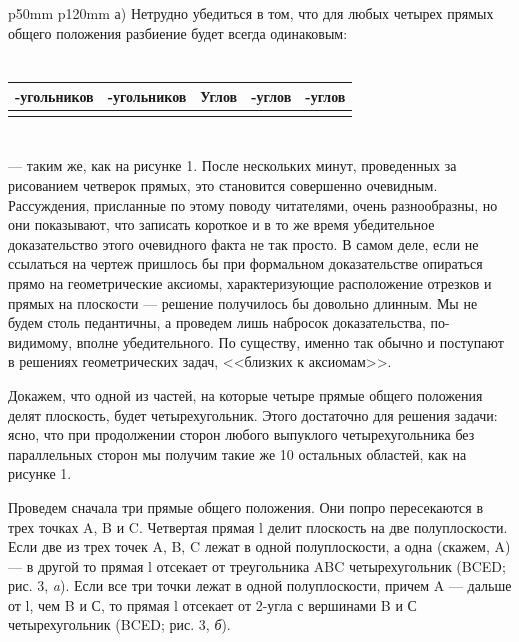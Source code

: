 \begin{tabular}{p{50mm} p{120mm}}
    а) Нетрудно убедиться в том, что для любых четырех прямых общего положения разбиение будет всегда одинаковым:
    \section*{}
    \vspace{-4mm}
    \renewcommand{\arraystretch}{2}
\begin{center}
\begin{tabularx}{\linewidth}{|>{\centering\arraybackslash}p{2.125cm}|>{\centering\arraybackslash}p{2.125cm}|>{\centering\arraybackslash}X|>{\centering\arraybackslash}X|>{\centering\arraybackslash}X|}
    \hline
    4-угольников & 3-угольников & Углов & 2-углов & 3-углов \\ \hline
    1 & 2 & 3 & 4 & 1 \\ \hline
\end{tabularx}
\end{center}



\section*{}
--- таким же, как на рисунке 1. После нескольких минут, проведенных за рисованием четверок прямых, это становится совершенно очевидным. Рассуждения, присланные по этому поводу читателями, очень разнообразны, но они показывают, что записать короткое и в то же время убедительное доказательство этого очевидного факта не так просто. В самом деле, если не ссылаться на чертеж пришлось бы при формальном доказательстве опираться прямо на геометрические аксиомы, характеризующие расположение отрезков и прямых на плоскости --- решение получилось бы довольно длинным. Мы не будем столь педантичны, а проведем лишь набросок доказательства, по-видимому, вполне убедительного. По существу, именно так обычно и поступают в решениях геометрических задач, <<близких к аксиомам>>.

Докажем, что одной из частей, на которые четыре прямые общего положения делят плоскость, будет четырехугольник. Этого достаточно для решения задачи: ясно, что при продолжении сторон любого выпуклого четырехугольника без параллельных сторон мы получим такие же 10 остальных областей, как на рисунке 1.

Проведем сначала три прямые общего положения. Они попро пересекаются в трех точках A, B и C. Четвертая прямая l делит плоскость на две полуплоскости. Если две из трех точек A, B, C лежат в одной полуплоскости, а одна (скажем, A) --- в другой то прямая l отсекает от треугольника ABC четырехугольник (BCED; рис. 3, \textit{a}). Если  все три точки лежат в одной полуплоскости, причем A --- дальше от l, чем B и С, то прямая l отсекает от 2-угла с вершинами B и С четырехугольник (BCED; рис. 3, \textit{б}).


\end{tabular}
